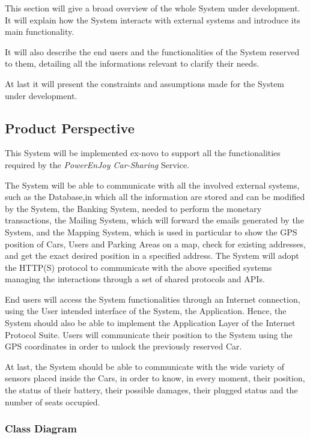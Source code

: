 This section will give a broad overview of the whole System under development. It will explain how the System interacts with external systems and introduce its main functionality.

It will also describe the end users and the functionalities of the System reserved to them, detailing all the informations relevant to clarify their needs.

At last it will present the constraints and assumptions made for the System under development.

\subsection{Product Perspective}

This System will be implemented ex-novo to support all the functionalities required by the \textit{PowerEnJoy Car-Sharing} Service.

The System will be able to communicate with all the involved external systems, such as the Database,in which all the information are stored and can be modified by the System, the Banking System, needed to perform the monetary transactions, the Mailing System, which will forward the emails generated by the System, and the Mapping System, which is used in particular to show the GPS position of Cars, Users and Parking Areas on a map, check for existing addresses, and get the exact desired position in a specified address. The System will adopt the HTTP(S) protocol to communicate with the above specified systems managing the interactions through a set of shared protocols and APIs.
\smallskip

End users will access the System functionalities through an Internet connection, using the User intended interface of the System, the Application. Hence, the System should also be able to implement the Application Layer of the Internet Protocol Suite.
Users will communicate their position to the System using the GPS coordinates in order to unlock the previously reserved Car.
\smallskip

At last, the System should be able to communicate with the wide variety of sensors placed inside the Cars, in order to know, in every moment, their position, the status of their battery, their possible damages, their plugged status and the number of seats occupied. 

\subsubsection{Class Diagram}
